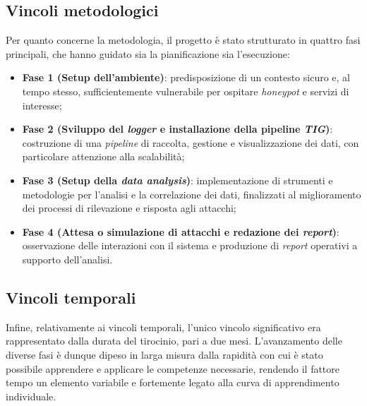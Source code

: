 \subsection{Vincoli metodologici}
Per quanto concerne la metodologia, il progetto è stato strutturato in quattro fasi principali, che hanno guidato sia la pianificazione sia l'esecuzione: 
\begin{itemize}
    \item \textbf{Fase 1 (Setup dell'ambiente)}: predisposizione di un contesto sicuro e, al tempo stesso, sufficientemente vulnerabile per ospitare \textit{honeypot} e servizi di interesse;
    \item \textbf{Fase 2 (Sviluppo del \textit{logger} e installazione della pipeline \textit{TIG})}: costruzione di una \textit{pipeline} di raccolta, gestione e visualizzazione dei dati, con particolare attenzione alla scalabilità;
    \item \textbf{Fase 3 (Setup della \textit{data analysis})}: implementazione di strumenti e metodologie per l'analisi e la correlazione dei dati, finalizzati al miglioramento dei processi di rilevazione e risposta agli attacchi;
    \item \textbf{Fase 4 (Attesa o simulazione di attacchi e redazione dei \textit{report})}: osservazione delle interazioni con il sistema e produzione di \textit{report} operativi a supporto dell'analisi.
\end{itemize}
\subsection{Vincoli temporali}
Infine, relativamente ai vincoli temporali, l'unico vincolo significativo era rappresentato dalla durata del tirocinio, pari a due mesi. L'avanzamento delle diverse fasi è dunque dipeso in larga misura dalla rapidità con cui è stato possibile apprendere e applicare le competenze necessarie, rendendo il fattore tempo un elemento variabile e fortemente legato alla curva di apprendimento individuale.

